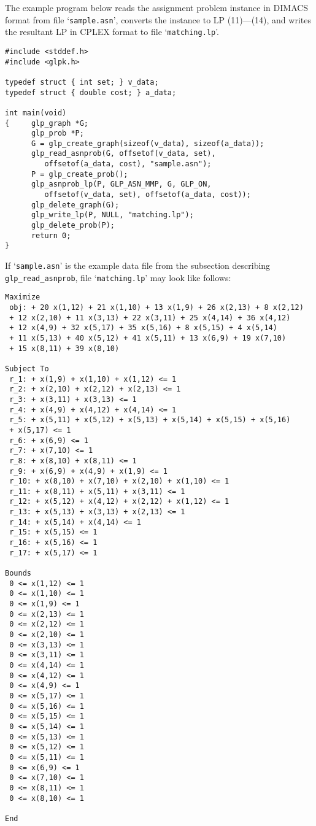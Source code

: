 \documentclass[11pt]{report}
\def\para#1{\noindent{\bf#1}}
\begin{document}
\para{Example}

The example program below reads the assignment problem instance in
DIMACS format from file `\verb|sample.asn|', converts the instance to
LP (11)---(14), and writes the resultant LP in CPLEX format to file
`\verb|matching.lp|'.

\begin{footnotesize}
\begin{verbatim}
#include <stddef.h>
#include <glpk.h>

typedef struct { int set; } v_data;
typedef struct { double cost; } a_data;

int main(void)
{     glp_graph *G;
      glp_prob *P;
      G = glp_create_graph(sizeof(v_data), sizeof(a_data));
      glp_read_asnprob(G, offsetof(v_data, set),
         offsetof(a_data, cost), "sample.asn");
      P = glp_create_prob();
      glp_asnprob_lp(P, GLP_ASN_MMP, G, GLP_ON,
         offsetof(v_data, set), offsetof(a_data, cost));
      glp_delete_graph(G);
      glp_write_lp(P, NULL, "matching.lp");
      glp_delete_prob(P);
      return 0;
}
\end{verbatim}
\end{footnotesize}

If `\verb|sample.asn|' is the example data file from the subsection
describing \verb|glp_read_asnprob|, file `\verb|matching.lp|' may look
like follows:

\begin{footnotesize}
\begin{verbatim}
Maximize
 obj: + 20 x(1,12) + 21 x(1,10) + 13 x(1,9) + 26 x(2,13) + 8 x(2,12)
 + 12 x(2,10) + 11 x(3,13) + 22 x(3,11) + 25 x(4,14) + 36 x(4,12)
 + 12 x(4,9) + 32 x(5,17) + 35 x(5,16) + 8 x(5,15) + 4 x(5,14)
 + 11 x(5,13) + 40 x(5,12) + 41 x(5,11) + 13 x(6,9) + 19 x(7,10)
 + 15 x(8,11) + 39 x(8,10)

Subject To
 r_1: + x(1,9) + x(1,10) + x(1,12) <= 1
 r_2: + x(2,10) + x(2,12) + x(2,13) <= 1
 r_3: + x(3,11) + x(3,13) <= 1
 r_4: + x(4,9) + x(4,12) + x(4,14) <= 1
 r_5: + x(5,11) + x(5,12) + x(5,13) + x(5,14) + x(5,15) + x(5,16)
 + x(5,17) <= 1
 r_6: + x(6,9) <= 1
 r_7: + x(7,10) <= 1
 r_8: + x(8,10) + x(8,11) <= 1
 r_9: + x(6,9) + x(4,9) + x(1,9) <= 1
 r_10: + x(8,10) + x(7,10) + x(2,10) + x(1,10) <= 1
 r_11: + x(8,11) + x(5,11) + x(3,11) <= 1
 r_12: + x(5,12) + x(4,12) + x(2,12) + x(1,12) <= 1
 r_13: + x(5,13) + x(3,13) + x(2,13) <= 1
 r_14: + x(5,14) + x(4,14) <= 1
 r_15: + x(5,15) <= 1
 r_16: + x(5,16) <= 1
 r_17: + x(5,17) <= 1

Bounds
 0 <= x(1,12) <= 1
 0 <= x(1,10) <= 1
 0 <= x(1,9) <= 1
 0 <= x(2,13) <= 1
 0 <= x(2,12) <= 1
 0 <= x(2,10) <= 1
 0 <= x(3,13) <= 1
 0 <= x(3,11) <= 1
 0 <= x(4,14) <= 1
 0 <= x(4,12) <= 1
 0 <= x(4,9) <= 1
 0 <= x(5,17) <= 1
 0 <= x(5,16) <= 1
 0 <= x(5,15) <= 1
 0 <= x(5,14) <= 1
 0 <= x(5,13) <= 1
 0 <= x(5,12) <= 1
 0 <= x(5,11) <= 1
 0 <= x(6,9) <= 1
 0 <= x(7,10) <= 1
 0 <= x(8,11) <= 1
 0 <= x(8,10) <= 1

End
\end{verbatim}
\end{footnotesize}
\end{document}
